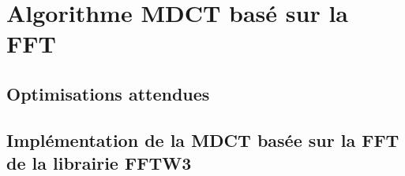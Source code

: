 \documentclass{article}
\begin{document}
    \newpage
    \section{Algorithme MDCT basé sur la FFT}
    \subsection{Optimisations attendues}



    
    


    \subsection{Implémentation de la MDCT basée sur la FFT de la librairie FFTW3}
\end{document}
